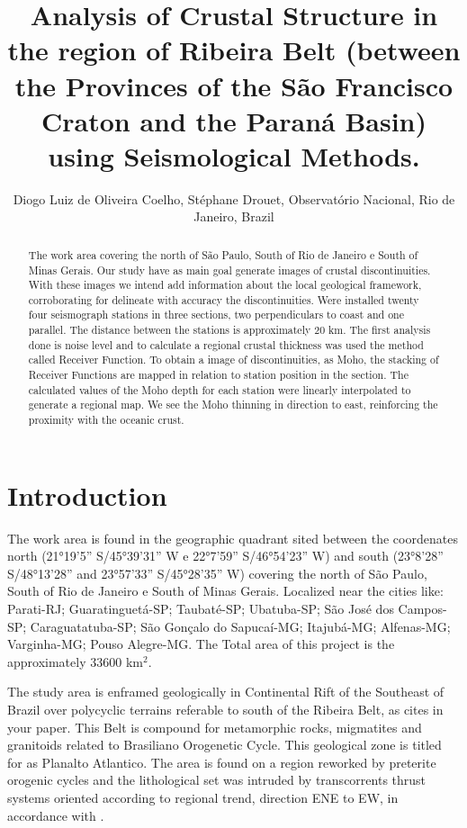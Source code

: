 \documentclass[twoside,letterpaper,twocolumn]{article}
\title{Analysis of Crustal Structure in the region of Ribeira Belt (between the Provinces of the S\~{a}o Francisco Craton and the Paran\'{a} Basin) using Seismological Methods.}
\author{Diogo Luiz de Oliveira Coelho, St\'{e}phane Drouet, Observat\'{o}rio Nacional, Rio de Janeiro, Brazil
}
\begin{document}
\maketitle

\begin{abstract}

The work area covering the north of S\~{a}o Paulo, South of Rio de Janeiro e South of Minas Gerais. Our study have as main goal generate images of crustal discontinuities. With these images we intend add information about the local geological framework, corroborating for delineate with accuracy the discontinuities. Were installed twenty four seismograph stations in three sections, two perpendiculars to coast and one parallel. The distance between the stations  is approximately 20 km.
The first analysis done is noise level and to calculate a regional crustal thickness was used the method called Receiver Function. To obtain a image of discontinuities, as Moho, the stacking of Receiver Functions are mapped in relation to station position in the section. The calculated values of the Moho depth for each station were linearly interpolated to generate a regional map. We see the Moho thinning in direction to east, reinforcing the proximity with the oceanic crust.

\end{abstract}

\section{Introduction}

The work area is found in the geographic quadrant sited between the coordenates north (21°19’5” S/45°39’31” W e 22°7’59” S/46°54’23” W) and south (23°8’28” S/48°13’28” and 23°57’33” S/45°28’35” W) covering the north of S\~{a}o Paulo, South of Rio de Janeiro e South of Minas Gerais. Localized near the cities like: Parati-RJ; Guaratinguet\'{a}-SP; Taubat\'{e}-SP; Ubatuba-SP; S\~{a}o Jos\'{e} dos Campos-SP; Caraguatatuba-SP; S\~{a}o Gon\c{c}alo do Sapuca\'{i}-MG; Itajub\'{a}-MG; Alfenas-MG; Varginha-MG; Pouso Alegre-MG. 
The Total area of this project is the approximately 33600 km$^{2}$.

The study area is enframed geologically in  Continental Rift of the Southeast of Brazil over polycyclic terrains referable to south of the Ribeira Belt, as \cite{riccomini_o_1990} cites in your paper. This Belt is compound for metamorphic rocks, migmatites and granitoids related to Brasiliano Orogenetic Cycle. This geological zone is titled for \cite{almeida_origem_1998} as Planalto Atlantico. The area is found on a region reworked by preterite orogenic cycles and the lithological set was intruded by transcorrents thrust systems oriented according to regional trend, direction ENE to EW, in accordance with \cite{hasui_evolucao_1976}.
\end{document}
